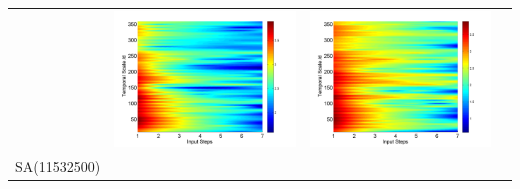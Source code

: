 \documentclass[draft,wrr]{AGUTeX}
\begin{document}
\begin{article}
\begin{table}[H]
\begin{tabular}{cccc}
&\begin{minipage}{.3\textwidth}\includegraphics[width=\linewidth]{resultgraph/05585000pep_rela.png}\end{minipage}
&\begin{minipage}{.3\textwidth}\includegraphics[width=\linewidth]{resultgraph/05585000pepq_rela.png}\end{minipage}
\\
SA(11532500)

\end{tabular}
\end{table}
\end{article}
\end{document}
